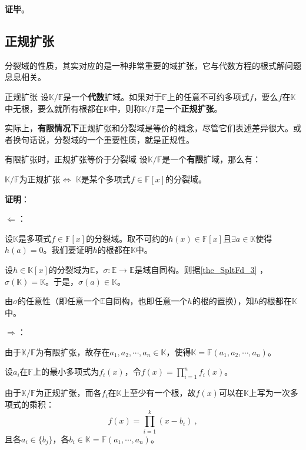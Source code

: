 \textbf{证毕}。




\subsection{正规扩张}

分裂域的性质，其实对应的是一种非常重要的域扩张，它与代数方程的根式解问题息息相关。

\begin{definition}{正规扩张}
设$\mathbb{K}/\mathbb{F}$是一个\textbf{代数}扩域。如果对于$\mathbb{F}$上的任意不可约多项式$f$，要么$f$在$\mathbb{K}$中无根，要么就所有根都在$\mathbb{K}$中，则称$\mathbb{K}/\mathbb{F}$是一个\textbf{正规扩张}。
\end{definition}

实际上，\textbf{有限情况下}正规扩张和分裂域是等价的概念，尽管它们表述差异很大。或者换句话说，分裂域的一个重要性质，就是正规性。


\begin{theorem}{有限扩张时，正规扩张等价于分裂域}\label{the_SpltFd_2}
设$\mathbb{K}/\mathbb{F}$是一个\textbf{有限}扩域，那么有：

$\mathbb{K}/\mathbb{F}$为正规扩张$\iff$ $\mathbb{K}$是某个多项式$f\in\mathbb{F}[x]$的分裂域。
\end{theorem}

\textbf{证明}：

$\Leftarrow$：

设$\mathbb{K}$是多项式$f\in\mathbb{F}[x]$的分裂域。取不可约的$h(x)\in\mathbb{F}[x]$且$\exists a\in\mathbb{K}$使得$h(a)=0$。我们要证明$h$的根都在$\mathbb{K}$中。


设$h\in\mathbb{K}[x]$的分裂域为$\mathbb{E}$，$\sigma:\mathbb{E}\to\mathbb{E}$是域自同构。则据\autoref{the_SpltFd_3} ，$\sigma(\mathbb{K})=\mathbb{K}$。于是，$\sigma(a)\in\mathbb{K}$。

由$\sigma$的任意性（即任意一个$\mathbb{E}$自同构，也即任意一个$h$的根的置换），知$h$的根都在$\mathbb{K}$中。



$\Rightarrow$：

由于$\mathbb{K}/\mathbb{F}$为有限扩张，故存在$a_1, a_2, \cdots, a_n\in \mathbb{K}$，使得$\mathbb{K}=\mathbb{F}(a_1, a_2, \cdots, a_n)$。

设$a_i$在$\mathbb{F}$上的最小多项式为$f_i(x)$，令$f(x)=\prod_{i=1}^n f_i(x)$。

由于$\mathbb{K}/\mathbb{F}$为正规扩张，而各$f_i$在$\mathbb{K}$上至少有一个根，故$f(x)$可以在$\mathbb{K}$上写为一次多项式的乘积：
\begin{equation}
f(x) = \prod_{i=1}^k (x-b_i)~,
\end{equation}
且各$a_i\in\{b_j\}$，各$b_i\in\mathbb{K}=\mathbb{F}(a_1, \cdots, a_n)$。

